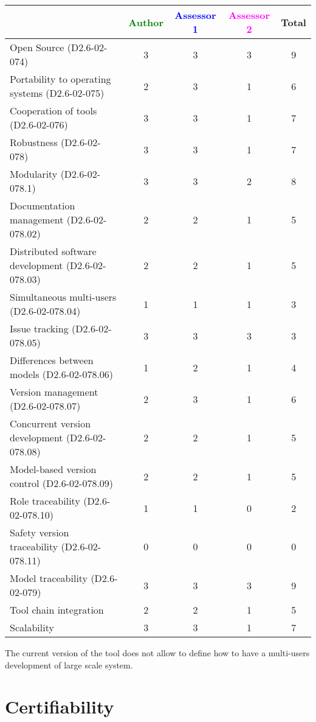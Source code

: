 \begin{tabular}{|l | c | c | c | c|}
\hline
& \textcolor{green}{Author} & \textcolor{blue}{Assessor 1} & \textcolor{magenta}{Assessor 2} & Total \\
\hline 
Open Source (D2.6-02-074) & 3 & 3 & 3 & 9  \\
\hline 
Portability to operating systems (D2.6-02-075) & 2 & 3 & 1 & 6  \\
\hline
Cooperation of tools (D2.6-02-076) & 3 & 3 & 1 & 7 \\
\hline
Robustness (D2.6-02-078) & 3 & 3 & 1 & 7 \\
\hline
Modularity (D2.6-02-078.1) & 3 & 3 & 2 & 8 \\
\hline
Documentation management (D2.6-02-078.02) & 2 & 2 & 1 & 5 \\
\hline
Distributed software development (D2.6-02-078.03)  & 2 & 2 & 1 & 5 \\
\hline
Simultaneous multi-users (D2.6-02-078.04)   & 1 & 1 & 1 & 3 \\
\hline
Issue tracking (D2.6-02-078.05) & 3 & 3 & 3 & 3 \\
\hline
Differences between models (D2.6-02-078.06) & 1 & 2 & 1 & 4 \\
\hline
Version management (D2.6-02-078.07) & 2 & 3 & 1 & 6 \\
\hline
Concurrent version development (D2.6-02-078.08) & 2 & 2 & 1 & 5 \\
\hline
Model-based version control (D2.6-02-078.09) & 2 & 2 & 1 & 5 \\
\hline
Role traceability (D2.6-02-078.10) & 1 & 1 & 0 & 2 \\
\hline
Safety version traceability (D2.6-02-078.11) & 0 & 0 & 0 & 0 \\
\hline
Model traceability (D2.6-02-079) & 3 & 3 & 3 & 9 \\
\hline
Tool chain integration & 2 & 2 & 1 & 5 \\
\hline
Scalability & 3 & 3 & 1 & 7 \\
\hline
\end{tabular}

\begin{assessor2}
The current version of the tool does not allow to  define how to  have a multi-users development of large scale system.
\end{assessor2}

\section{Certifiability}

